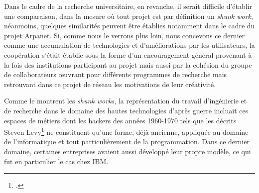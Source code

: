 \documentclass{FramateX}
\begin{document}
\begin{refsection}
Dans le cadre de la recherche universitaire, en revanche, il serait
difficile d'établir une comparaison, dans la mesure où
tout projet est par définition un \textit{shunk work}, néanmoins,
quelques similarités peuvent être établies notamment dans le cadre du
projet Arpanet. Si, comme nous le verrons plus loin, nous concevons ce
dernier comme une accumulation de technologies et
d'améliorations par les utilisateurs, la coopération
s'était établie sous la forme d'un
encouragement général provenant à la fois des institutions participant
au projet mais aussi par la cohésion du groupe de collaborateurs
œuvrant pour différents programmes de recherche mais retrouvant dans ce
projet de réseau les motivations de leur créativité.

Comme le montrent les \textit{shunk works}, la représentation du travail
d'ingénierie et de recherche dans le domaine des
hautes technologies d'après guerre incluait ces
espaces de métiers dont les hackers des années 1960-1970 tels que les
décrits Steven Levy\footnote{\cite{levyhackers1994}.} ne constituent qu'une forme, déjà ancienne,
appliquée au domaine de l'informatique et tout
particulièrement de la programmation. Dans ce dernier domaine,
certaines entreprises avaient aussi développé leur propre modèle, ce
qui fut en particulier le cas chez IBM.


\end{refsection}
\end{document}
